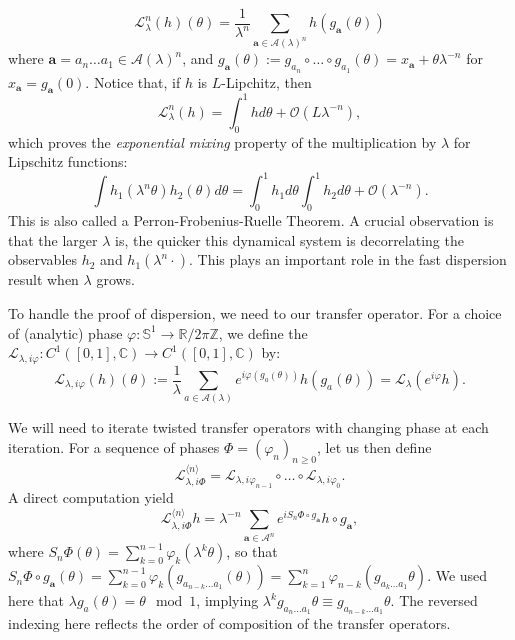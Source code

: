 \documentclass[11pt]{amsart}
\renewcommand{\phi}{\varphi}
\theoremstyle{plain}
\theoremstyle{definition}
\numberwithin{equation}{section}
\begin{document}
$$
\mathcal{L}_\lambda^n(h)(\theta) = \frac{1}{\lambda^n}\sum_{\mathbf{a} \in \mathcal{A}(\lambda)^n} h(g_\mathbf{a}(\theta))
$$
where $\mathbf{a} = a_n\dots a_1 \in \mathcal{A}(\lambda)^n$, and $g_{\mathbf{a}}(\theta) := g_{a_n} \circ \dots \circ g_{a_1}(\theta) = x_\mathbf{a}+ \theta \lambda^{-n} $ for $x_\mathbf{a} = g_\mathbf{a}(0)$. Notice that, if $h$ is $L$-Lipchitz, then
$$ \mathcal{L}_\lambda^n(h) = \int_0^1 h d\theta + \mathcal{O}(L \lambda^{-n}), $$
which proves the \textit{exponential mixing} property of the multiplication by $\lambda$ for Lipschitz functions:
$$ \int h_1(\lambda^n \theta) h_2(\theta) d\theta = \int_0^1 h_1 d\theta \int_0^1 h_2 d\theta + \mathcal{O}(\lambda^{-n}). $$
This is also called a Perron-Frobenius-Ruelle Theorem. A crucial observation is that the larger $\lambda$ is, the quicker this dynamical system is decorrelating the observables $h_2$ and $h_1(\lambda^n \cdot)$. This plays an important role in the fast dispersion result when $\lambda$ grows. %

To handle the proof of dispersion, we need to  our transfer operator. For a choice of (analytic) phase $\varphi:\mathbb{S}^1 \rightarrow \mathbb{R} / 2\pi \mathbb{Z}$, we define the  $\mathcal{L}_{\lambda,i \phi} : C^1([0,1],\mathbb{C}) \rightarrow C^1([0,1],\mathbb{C})$ by:
$$ \mathcal{L}_{\lambda,i\phi}(h)(\theta) := \frac{1}{\lambda}\sum_{a \in \mathcal{A}(\lambda)} e^{i \phi(g_a(\theta))} h(g_a(\theta)) = \mathcal{L}_\lambda(e^{i \phi} h). $$

We will need to iterate twisted transfer operators with changing phase at each iteration. For a sequence of phases $\Phi = (\phi_n)_{n \geq 0}$, let us then define
$$ \mathcal{L}_{\lambda,i \Phi}^{\langle n \rangle} = \mathcal{L}_{\lambda,i \phi_{n-1}} \circ \dots \circ \mathcal{L}_{\lambda,i \phi_0} .$$ A direct computation yield
$$ \mathcal{L}_{\lambda,i \Phi}^{\langle n \rangle} h = \lambda^{-n} \sum_{\mathbf{a} \in \mathcal{A}^{n}} e^{i S_n \Phi \circ g_\mathbf{a}} h \circ g_\mathbf{a}, $$
where $S_n \Phi(\theta) = \sum_{k=0}^{n-1} \phi_k(\lambda^k \theta)$, so that  $S_n\Phi\circ g_{\mathbf{a}}(\theta) =\sum_{k=0}^{n-1} \phi_k(g_{a_{n-k}\dots a_{1}}(\theta))=\sum_{k=1}^{n} \phi_{n-k} (g_{a_{k}\dots a_{1}} \theta)$. We used here that $\lambda g_a(\theta) = \theta \mod 1$, implying $\lambda^k g_{a_n\dots a_1}\theta\equiv g_{a_{n-k}\dots a_1}\theta$. The reversed indexing here reflects the order of composition of the transfer operators. \\
\end{document}
